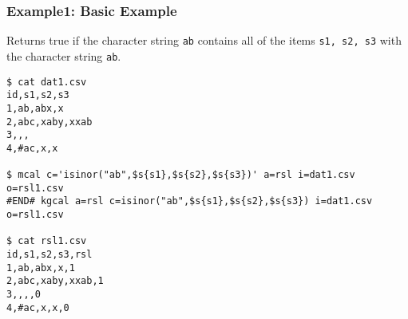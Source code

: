 
\subsubsection*{Example1: Basic Example}
Returns true if the character string \verb|ab| contains all of the items \verb|s1, s2, s3| with the character string \verb|ab|.

\begin{Verbatim}[baselinestretch=0.7,frame=single]
$ cat dat1.csv
id,s1,s2,s3
1,ab,abx,x
2,abc,xaby,xxab
3,,,
4,#ac,x,x

$ mcal c='isinor("ab",$s{s1},$s{s2},$s{s3})' a=rsl i=dat1.csv o=rsl1.csv
#END# kgcal a=rsl c=isinor("ab",$s{s1},$s{s2},$s{s3}) i=dat1.csv o=rsl1.csv

$ cat rsl1.csv
id,s1,s2,s3,rsl
1,ab,abx,x,1
2,abc,xaby,xxab,1
3,,,,0
4,#ac,x,x,0
\end{Verbatim}
